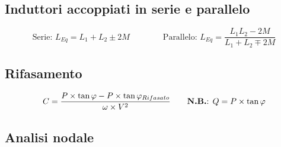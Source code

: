 \documentclass[10pt]{article}
\begin{document}
    \hspace{-.65cm}
    \begin{minipage}[t]{.45\textwidth}
        \subsection*{Induttori accoppiati in serie e parallelo}
    
            \[
                \text{Serie: } L_{Eq} = L_1 + L_2 \pm 2M \qquad\qquad \text{Parallelo: } L_{Eq} = \frac{L_1 L_2 - 2M}{L_1 + L_2 \mp 2M}
            \]
    \end{minipage}
    \hfill
    \begin{minipage}[t]{.45\textwidth}
        \subsection*{Rifasamento}

            \[
                C = \frac{P \times \tan \varphi - P \times \tan \varphi_{Rifasato}}{\omega \times V^2} \qquad \text{\textbf{N.B.}: }Q = P \times \tan \varphi
            \]
    \end{minipage}

    \newpage

    \subsection*{Analisi nodale}
    \vspace{-1.5\baselineskip}
\end{document}
